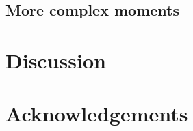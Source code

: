 \documentclass[hidelinks,11pt]{article}
\begin{document}

    \subsection{More complex moments}\label{subsec:other-quantities}


    \section{Discussion}\label{sec:discussion}

    \section*{Acknowledgements}

    \newpage
    

    \newpage
    \appendix
    
\end{document}
